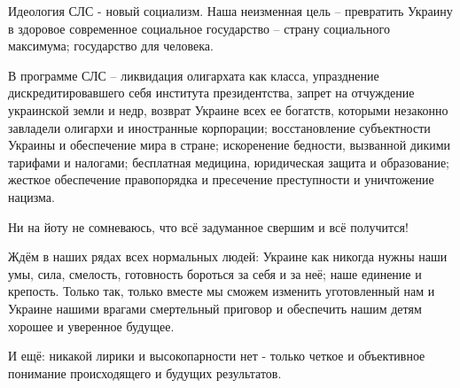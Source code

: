 Идеология СЛС - новый социализм. Наша неизменная цель – превратить Украину в
здоровое современное социальное государство – страну социального максимума;
государство для человека. 

В программе СЛС – ликвидация олигархата как класса, упразднение
дискредитировавшего себя института президентства, запрет на отчуждение
украинской земли и недр, возврат Украине всех ее богатств, которыми незаконно
завладели олигархи и иностранные корпорации; восстановление субъектности
Украины и обеспечение мира в стране; искоренение бедности, вызванной дикими
тарифами и налогами; бесплатная медицина, юридическая защита и образование;
жесткое обеспечение правопорядка и пресечение преступности и уничтожение
нацизма. 

Ни на йоту не сомневаюсь, что всё задуманное свершим и всё получится! 

Ждём в наших рядах всех нормальных людей: Украине как никогда нужны наши умы,
сила, смелость, готовность бороться за себя и за неё; наше единение и крепость.
Только так, только вместе мы сможем изменить уготовленный нам и Украине нашими
врагами смертельный приговор и обеспечить нашим детям хорошее и уверенное
будущее. 

И ещё: никакой лирики и высокопарности нет - только четкое и объективное
понимание происходящего и будущих результатов.

